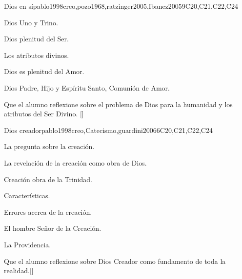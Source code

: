 \begin{syllabus}
\begin{unit}{}{Dios en sí­}{pablo1998creo,pozo1968,ratzinger2005,Ibanez2005}{9}{C20,C21,C22,C24}
\begin{topics}
	\item Dios Uno y Trino.
	    \begin{subtopics}
		\item Dios plenitud del Ser.
		\item Los atributos divinos.
		\item Dios es plenitud del Amor.
		\item Dios Padre, Hijo y Espíritu Santo, Comunión de Amor.
	    \end{subtopics}
\end{topics}
\begin{learningoutcomes}
	\item Que el  alumno reflexione sobre el problema de Dios para la humanidad y los atributos del Ser Divino. [\Familiarity]
\end{learningoutcomes}
\end{unit}

\begin{unit}{}{Dios creador}{pablo1998creo,Catecismo,guardini2006}{6}{C20,C21,C22,C24}
\begin{topics}
	\item La pregunta sobre la creación.
	      \begin{subtopics}
		\item La revelación de la creación como obra de Dios.
		\item Creación obra de la Trinidad.
		\item Características.
		\item Errores acerca de la creación.
		\item El hombre Señor de la Creación.
		\item La Providencia.
	      \end{subtopics}
\end{topics}
\begin{learningoutcomes}
	\item Que el  alumno reflexione sobre Dios Creador como fundamento de toda la realidad.[\Familiarity]
\end{learningoutcomes}
\end{unit}


\end{syllabus}
